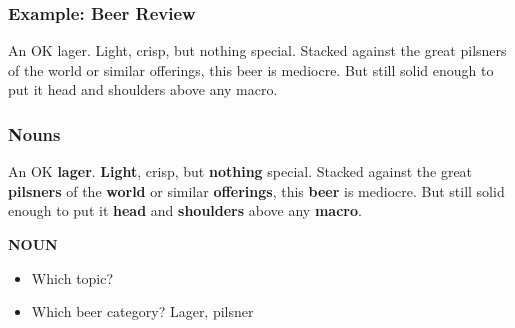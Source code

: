 \begin{frame}
    \frametitle{Example: Beer Review}
\begin{spacing}{1.6}
    An OK lager. Light, crisp, but nothing special. Stacked against the great pilsners of the world or similar offerings, this beer is mediocre. But still solid enough to put it head and shoulders above any macro. 
\end{spacing}

\end{frame}


\begin{frame}
    \frametitle{Nouns}
\begin{spacing}{1.6}
    An OK \textbf{\textcolor{isered}{lager}}. \textbf{\textcolor{isered}{Light}}, crisp, but \textbf{\textcolor{isered}{nothing}} special. Stacked against the great \textbf{\textcolor{isered}{pilsners}} of the \textbf{\textcolor{isered}{world}} or similar \textbf{\textcolor{isered}{offerings}}, this \textbf{\textcolor{isered}{beer}} is mediocre. But still solid enough to put it \textbf{\textcolor{isered}{head}} and \textbf{\textcolor{isered}{shoulders}} above any \textbf{\textcolor{isered}{macro}}.
\end{spacing}

\vspace{-10pt}
\begin{flushright}
    \textbf{\textcolor{isered}{NOUN}}
\end{flushright}

\vspace{-10pt}
\begin{itemize}
\item Which topic?
\item Which beer category? Lager, pilsner
\end{itemize}
\end{frame}



